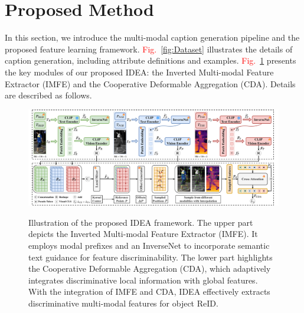 \section{Proposed Method}
\label{sec:methods}
In this section, we introduce the multi-modal caption generation pipeline and the proposed feature learning framework.
%
\textcolor{red}{Fig.}~\ref{fig:Dataset} illustrates the details of caption generation, including attribute definitions and examples.
%
\textcolor{red}{Fig.}~\ref{fig:Overall} presents the key modules of our proposed IDEA: the Inverted Multi-modal Feature Extractor (IMFE) and the Cooperative Deformable Aggregation (CDA).
%
Details are described as follows.
%
\begin{figure}[t]
    \centering
      \resizebox{1.0\textwidth}{!}
      {
    \includegraphics[width=30\linewidth]{sec/img/Overall.pdf}
    }
    \vspace{-4mm}
     \caption{Illustration of the proposed IDEA framework.
     The upper part depicts the Inverted Multi-modal Feature Extractor (IMFE).
     It employs modal prefixes and an InverseNet to incorporate semantic text guidance for feature discriminability.
     The lower part highlights the Cooperative Deformable Aggregation (CDA), which adaptively integrates discriminative local information with global features.
     With the integration of IMFE and CDA, IDEA effectively extracts discriminative multi-modal features for object ReID.}
    \label{fig:Overall}
    \vspace{-2mm}
  \end{figure}
